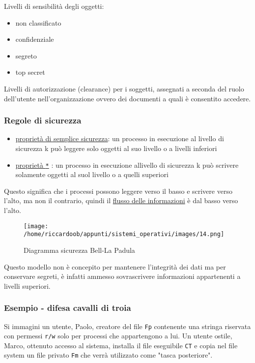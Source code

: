 Livelli di sensibilità degli oggetti:
\begin{itemize}
    \item non classificato
    \item confidenziale
    \item segreto
    \item top secret
\end{itemize}

Livelli di autorizzazione (clearance) per i soggetti, assegnati a seconda del ruolo dell'utente nell'organizzazione ovvero dei documenti a quali è consentito accedere.

\subsubsection{Regole di sicurezza}
\begin{itemize}
    \item \underline{proprietà di semplice sicurezza}: un processo in esecuzione al livello di sicurezza k può leggere solo oggetti al suo livello o a livelli inferiori
    \item \underline{proprietà \texttt{*}} : un processo in esecuzione allivello di sicurezza k può scrivere solamente oggetti al suol livello o a quelli superiori
\end{itemize}

Questo significa che i processi possono leggere verso il basso e scrivere verso l'alto, ma non il contrario, quindi il \underline{flusso delle informazioni} è dal basso verso l'alto.

\begin{figure}[H]
    \caption{Diagramma sicurezza Bell-La Padula}
    \centering
    \texttt{[image: /home/riccardoob/appunti/sistemi\_operativi/images/14.png]}
\end{figure}

Questo modello non è concepito per mantenere l'integrità dei dati ma per conservare segreti, è infatti ammesso sovrascrivere informazioni appartenenti a livelli superiori.

\subsubsection{Esempio - difesa cavalli di troia}

Si immagini un utente, Paolo, creatore del file \texttt{Fp} contenente una stringa riservata con permessi \texttt{r/w} solo per processi che appartengono a lui. Un utente ostile, Marco, ottenuto accesso al sistema, installa il file eseguibile \texttt{CT} e copia nel file system un file privato \texttt{Fm} che verrà utilizzato come "tasca posteriore".

